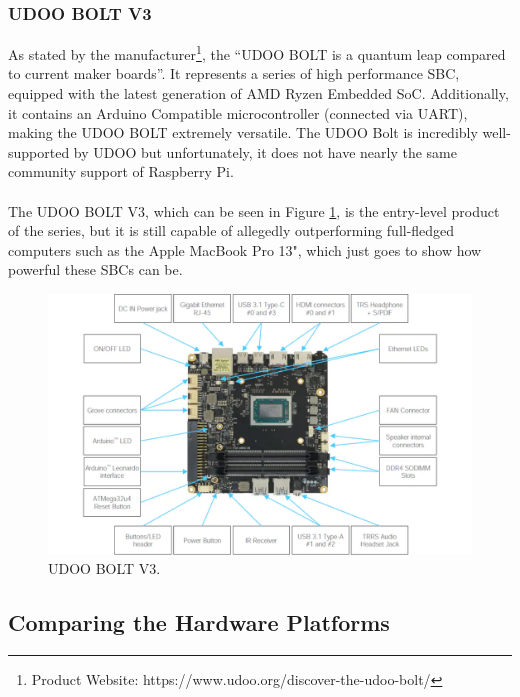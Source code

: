 \subsubsection{UDOO BOLT V3}

As stated by the manufacturer\footnote{Product Website: https://www.udoo.org/discover-the-udoo-bolt/}, the ``UDOO BOLT is a quantum leap compared to current maker boards''. It represents a series of high performance \acs{SBC}, equipped with the latest generation of AMD Ryzen Embedded SoC. Additionally, it contains an Arduino Compatible microcontroller (connected via UART), making the UDOO BOLT extremely versatile.
The UDOO Bolt is incredibly well-supported by UDOO but unfortunately, it does not have nearly the same community support of Raspberry Pi.

\paragraph{} The UDOO BOLT V3, which can be seen in Figure \ref{fig:udoobolt-image}, is the entry-level product of the series, but it is still capable of allegedly outperforming full-fledged computers such as the Apple MacBook Pro 13", which just goes to show how powerful these \acs{SBC}s can be.


\begin{figure}[H]
    \centering
    \includegraphics[width=\linewidth]{images/UDOO_BOLT_GEAR_BLT.png}
    \caption{UDOO BOLT V3.}
    \label{fig:udoobolt-image}
\end{figure}

\subsection{Comparing the Hardware Platforms}

